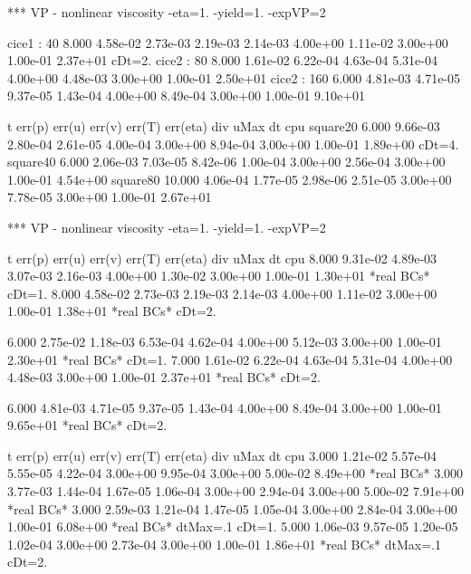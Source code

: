 {%
*** VP - nonlinear viscosity -eta=1. -yield=1. -expVP=2

cice1 : 40   8.000 4.58e-02 2.73e-03 2.19e-03 2.14e-03 4.00e+00 1.11e-02  3.00e+00 1.00e-01 2.37e+01 cDt=2.
cice2 : 80   8.000 1.61e-02 6.22e-04 4.63e-04 5.31e-04 4.00e+00 4.48e-03  3.00e+00 1.00e-01 2.50e+01
cice2 : 160  6.000 4.81e-03 4.71e-05 9.37e-05 1.43e-04 4.00e+00 8.49e-04  3.00e+00 1.00e-01 9.10e+01

           t    err(p)   err(u)   err(v)   err(T)   err(eta)    div       uMax     dt       cpu
square20  6.000 9.66e-03 2.80e-04 2.61e-05 4.00e-04 3.00e+00 8.94e-04  3.00e+00 1.00e-01 1.89e+00 cDt=4.
square40  6.000 2.06e-03 7.03e-05 8.42e-06 1.00e-04 3.00e+00 2.56e-04  3.00e+00 1.00e-01 4.54e+00
square80 10.000 4.06e-04 1.77e-05 2.98e-06 2.51e-05 3.00e+00 7.78e-05  3.00e+00 1.00e-01 2.67e+01

*** VP - nonlinear viscosity -eta=1. -yield=1. -expVP=2

     t    err(p)   err(u)   err(v)   err(T)   err(eta)    div       uMax     dt       cpu
   8.000 9.31e-02 4.89e-03 3.07e-03 2.16e-03 4.00e+00 1.30e-02  3.00e+00 1.00e-01 1.30e+01 *real BCs* cDt=1.
   8.000 4.58e-02 2.73e-03 2.19e-03 2.14e-03 4.00e+00 1.11e-02  3.00e+00 1.00e-01 1.38e+01 *real BCs* cDt=2.

   6.000 2.75e-02 1.18e-03 6.53e-04 4.62e-04 4.00e+00 5.12e-03  3.00e+00 1.00e-01 2.30e+01 *real BCs* cDt=1.
   7.000 1.61e-02 6.22e-04 4.63e-04 5.31e-04 4.00e+00 4.48e-03  3.00e+00 1.00e-01 2.37e+01 *real BCs* cDt=2.

   6.000 4.81e-03 4.71e-05 9.37e-05 1.43e-04 4.00e+00 8.49e-04  3.00e+00 1.00e-01 9.65e+01 *real BCs* cDt=2. 

     t    err(p)   err(u)   err(v)   err(T)   err(eta)    div       uMax     dt       cpu
   3.000 1.21e-02 5.57e-04 5.55e-05 4.22e-04 3.00e+00 9.95e-04  3.00e+00 5.00e-02 8.49e+00  *real BCs*
   3.000 3.77e-03 1.44e-04 1.67e-05 1.06e-04 3.00e+00 2.94e-04  3.00e+00 5.00e-02 7.91e+00  *real BCs*
   3.000 2.59e-03 1.21e-04 1.47e-05 1.05e-04 3.00e+00 2.84e-04  3.00e+00 1.00e-01 6.08e+00  *real BCs* dtMax=.1 cDt=1. 
   5.000 1.06e-03 9.57e-05 1.20e-05 1.02e-04 3.00e+00 2.73e-04  3.00e+00 1.00e-01 1.86e+01  *real BCs* dtMax=.1 cDt=2.



}
